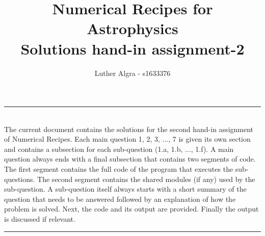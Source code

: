 \documentclass[a4paper,10pt]{article}
\title{\textbf{Numerical Recipes for Astrophysics \\ Solutions hand-in assignment-2}}
\author{Luther Algra - s1633376}
\renewenvironment{abstract}
 { \vspace*{0.3cm} \textbf{\abstractname} \vspace{0.1cm} \\ \ignorespaces}
 {\par\medskip \vspace{0.1cm}}
\begin{document}
\maketitle

\hrule
\begin{abstract}
The current document contains the solutions for the second hand-in assignment of Numerical Recipes. Each main question 1, 2, 3, ..., 7 is given its own section and contains a subsection for each sub-question (1.a, 1.b, ..., 1.f). A main question always ends with a final subsection that contains two segments of code. The first segment contains the full code of the program that executes the sub-questions. The second segment contains the shared modules (if any) used by the sub-question. A sub-question itself always starts with a short summary of the question that needs to be answered followed by an explanation of how the problem is solved. Next, the code and its output are provided. Finally the output is discussed if relevant. 


\end{abstract}
\hrule
\vspace{0.5cm}







  
\end{document}
